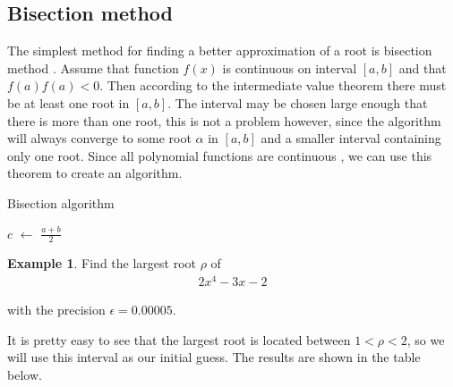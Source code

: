 \documentclass[
  digital, %
  table,   %
  nolof,     %
  nolot,     %
	draft, %
]{fithesis3}
\begin{document}
\subsection{Bisection method}
The simplest method for finding a better approximation of a root is bisection method \parencite{rootApproxMeth}. Assume that function $f(x)$ is continuous on interval $[a,b]$ and that $f(a)f(a) < 0$. Then according to the intermediate value theorem \parencite{interValue} there must be at least one root in $[a,b]$. The interval may be chosen large enough that there is more than one root, this is not a problem however, since the algorithm will always converge to some root $\alpha$ in $[a,b]$ and a smaller interval containing only one root. Since all polynomial functions are continuous \parencite{polyCont}, we can use this theorem to create an algorithm.

\newcommand*\Let[2]{\State #1 $\gets$ #2}
\algrenewcommand{}
\algrenewcommand{}
\begin{algorithm}
  \caption{Bisection algorithm
    \label{alg:bisect}}
  \begin{algorithmic}[1]
    \Statex
      \Let{$c$}{$\frac{a + b}{2}$}
			\EndIf
				\State {}
				\Else \State {}
			\EndIf
    \EndFunction
  \end{algorithmic}
\end{algorithm}

\theoremstyle{definition}
\newtheorem{example}{Example}[section]
\begin{example}
Find the largest root $\rho$ of 
\begin{align}
      2x^{4} - 3x - 2
\end{align}

with the precision $\epsilon = 0.00005$.
\end{example}

It is pretty easy to see that the largest root is located between $1 < \rho < 2$, so we will use this interval as our initial guess. The results are shown in the table below.
\end{document}
